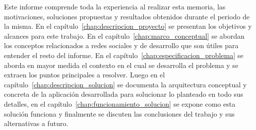 \begin{intro}
  Este informe comprende toda la experiencia al realizar esta memoria, las motivaciones, soluciones propuestas y resultados obtenidos durante el periodo de la misma. En el capítulo~\ref{chap:descripcion_proyecto} se presentan los objetivos y alcances para este trabajo. En el capítulo~\ref{chap:marco_conceptual} se abordan los conceptos relacionados a redes sociales y de desarrollo que son útiles para entender el resto del informe. En el capítulo~\ref{chap:especificacion_problema} se aborda en mayor medida el contexto en el cual se desarrolla el problema y se extraen los puntos principales a resolver. Luego en el capítulo~\ref{chap:descripcion_solucion} se documenta la arquitectura conceptual y concreta de la aplicación desarrollada para solucionar lo planteado en todo sus detalles, en el capítulo~\ref{chap:funcionamiento_solucion} se expone como esta solución funciona y finalmente se discuten las conclusiones del trabajo y sus alternativas a futuro.\\
  
\end{intro}